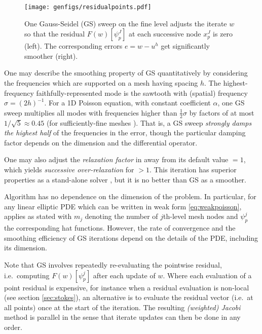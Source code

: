 \documentclass[letterpaper,final,12pt,reqno]{amsart}
\theoremstyle{claim}
\numberwithin{equation}{section}
\numberwithin{figure}{section}
\numberwithin{table}{section}
\numberwithin{theorem}{section}
\begin{document}
\begin{figure}[t]
\texttt{[image: genfigs/residualpoints.pdf]}
\caption{One Gauss-Seidel (GS) sweep on the fine level adjusts the iterate $w$ so that the residual $F(w)[\psi_p^J]$ at each successive node $x_p^J$ is zero (left).  The corresponding errors $e=w-u^h$ get significantly smoother (right).}
\label{fig:residualpoints}
\end{figure}

One may describe the smoothing property of GS quantitatively by considering the frequencies which are supported on a mesh having spacing $h$.  The highest-frequency faithfully-represented mode is the sawtooth with (spatial) frequency $\sigma=(2h)^{-1}$.  For a 1D Poisson equation, with constant coefficient $\alpha$, one GS sweep multiplies all modes with frequencies higher than $\frac{1}{2} \sigma$ by factors of at most $1/\sqrt{5}\approx 0.45$ (for sufficiently-fine meshes \cite[Chapter 4]{Briggsetal2000}).  That is, a GS sweep \emph{strongly damps the highest half} of the frequencies in the error, though the particular damping factor depends on the dimension and the differential operator.

One may also adjust the \emph{relaxation factor}  in  away from its default value  $=1$, which yields \emph{successive over-relaxation} for  $>1$.  This iteration has superior properties as a stand-alone solver \cite{Greenbaum1997}, but it is no better than GS as a smoother.

Algorithm  has no dependence on the dimension of the problem.  In particular, for any linear elliptic PDE which can be written in weak form \eqref{eq:weakpoisson},  applies as stated with $m_j$ denoting the number of $j$th-level mesh nodes and $\psi_p^j$ the corresponding hat functions.  However, the rate of convergence and the smoothing efficiency of GS iterations depend on the details of the PDE, including its dimension.

Note that GS involves repeatedly re-evaluating the pointwise residual, i.e.~computing $F(w)[\psi_p^j]$ after each update of $w$.  Where each evaluation of a point residual is expensive, for instance when a residual evaluation is non-local (see section \ref{sec:stokes}), an alternative is to evaluate the residual vector (i.e.~at all points) once at the start of the iteration.  The resulting \emph{(weighted) Jacobi} method is parallel in the sense that iterate updates can then be done in any order.
\end{document}
